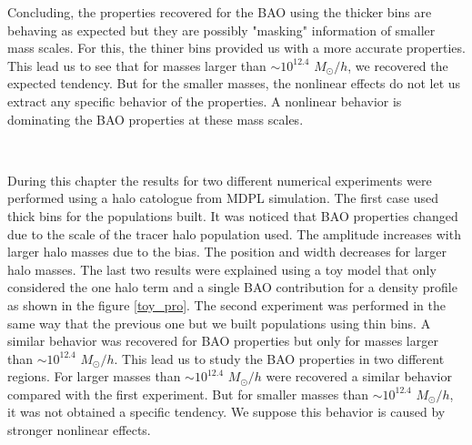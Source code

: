 Concluding, the properties recovered for the BAO using the thicker bins are behaving
as expected but they are possibly "masking" information of smaller mass scales. For this, 
the thiner bins provided us with a more accurate properties. This lead us to see that
for masses larger than $\sim 10^{12.4}$ $M_{\odot}/h$, we recovered the expected tendency. But for
the smaller masses, the nonlinear effects do not let us extract any specific behavior
of the properties. A nonlinear behavior is dominating the BAO properties at these mass
scales. 

\



During this chapter the results for two different numerical experiments were performed
using a halo catologue from MDPL simulation. The first case used thick bins for the populations
built. It was noticed that BAO properties changed due to the scale of the tracer halo population
used. The amplitude increases with larger halo masses due to the bias. The position 
and width decreases for larger halo masses. The last two results were explained using a toy
model that only considered the one halo term and a single BAO contribution for a density
profile as shown in the figure \ref{toy_pro}. 
The second experiment was performed in the same way that the previous one but we built
populations using thin bins. A similar behavior was recovered for BAO properties but 
only for masses larger than $\sim 10^{12.4}$ $M_{\odot}/h$. This lead us to study the
BAO properties in two different regions. For larger masses than $\sim 10^{12.4}$ $M_{\odot}/h$
were recovered a similar behavior compared with the first experiment. But for smaller masses
than $\sim 10^{12.4}$ $M_{\odot}/h$, it was not obtained a specific tendency. We suppose
this behavior is caused by stronger nonlinear effects. 